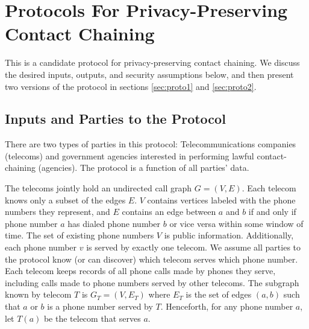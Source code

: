 \section{Protocols For Privacy-Preserving Contact Chaining}
\label{sec:proto}

This is a candidate protocol for privacy-preserving contact chaining. We discuss the desired inputs, outputs, and security assumptions below, and then present two versions of the protocol in sections \ref{sec:proto1} and \ref{sec:proto2}.

\subsection{Inputs and Parties to the Protocol}

There are two types of parties in this protocol: Telecommunications companies (telecoms) and government agencies interested in performing lawful contact-chaining (agencies). The protocol is a function of all parties' data.

The telecoms jointly hold an undirected call graph $G=(V,E)$. Each telecom knows only a subset of the edges $E$. $V$ contains vertices labeled with the phone numbers they represent, and $E$ contains an edge between $a$ and $b$ if and only if phone number $a$ has dialed phone number $b$ or vice versa within some window of time. The set of existing phone numbers $V$ is public information. Additionally, each phone number $v$ is served by exactly one telecom. We assume all parties to the protocol know (or can discover) which telecom serves which phone number. Each telecom keeps records of all phone calls made by phones they serve, including calls made to phone numbers served by other telecoms. The subgraph known by telecom $T$ is $G_T=(V, E_T)$ where $E_T$ is the set of edges $(a, b)$ such that $a$ or $b$ is a phone number served by $T$. Henceforth, for any phone number $a$, let $T(a)$ be the telecom that serves $a$.

